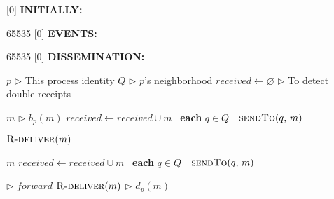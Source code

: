 
[0] {\textbf{INITIALLY:}}

{65535}{}
[0] {\textbf{EVENTS:}}

{65535}{}
[0] {\textbf{DISSEMINATION:}}


\newcommand{\comment}[1]{$\rhd$ #1}
\newcommand{\LINEIFTHEN}[2]{%
  \algorithmicif\ {#1}\ \algorithmicthen\ {#2} %
}
\newcommand{\LINEIFTHENELSE}[3]{%
  \algorithmicif\ {#1}\ \algorithmicthen\ {#2} \algorithmicelse\ {#3}%
}

\newcommand{\LINEFOR}[2]{%
  \algorithmicfor\ {#1}\ \algorithmicdo\ {#2} %
}

\begin{algorithmic}[1]
  \small

  \initially
  \State $p$ \hfill \comment{This process identity}
  \State $Q$ \hfill \comment{$p$'s neighborhood}
  \State $received \leftarrow \varnothing$ \hfill
  \comment{To detect double receipts} 
  \endInitially
  
  \dissemination

   {$m$} \hfill \comment{$b_p(m)$}
  \State $received \leftarrow received \cup m$
  \State \LINEFOR{\textbf{each} $q \in Q$} 
  {$\textsc{sendTo}(q,\, m)$}
  \State $\textsc{R-deliver}(m)$ 
  \EndFunction
  
  \Statex


  
   {$m$}  
  \State $received \leftarrow received \cup m$
  \State \LINEFOR{\textbf{each} $q \in Q$} {$\textsc{sendTo}(q,\, m)$}
  \hfill \comment{$forward$}
  \State $\textsc{R-deliver}(m)$ \hfill \comment{$d_p(m)$}
  \EndIf

  \EndFunction

\end{algorithmic}


